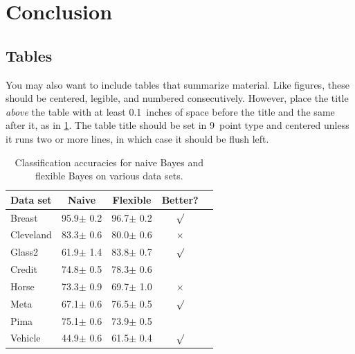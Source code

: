 \documentclass[nohyperref]{article}
\theoremstyle{plain}
\theoremstyle{definition}
\theoremstyle{remark}
\begin{document}
\section{Conclusion}



\subsection{Tables}

You may also want to include tables that summarize material. Like
figures, these should be centered, legible, and numbered consecutively.
However, place the title \emph{above} the table with at least
0.1~inches of space before the title and the same after it, as in
\cref{sample-table}. The table title should be set in 9~point
type and centered unless it runs two or more lines, in which case it
should be flush left.


\begin{table}[t]
\caption{Classification accuracies for naive Bayes and flexible
Bayes on various data sets.}
\label{sample-table}
\vskip 0.15in
\begin{center}
\begin{small}
\begin{sc}
\begin{tabular}{lcccr}
\toprule
Data set & Naive & Flexible & Better? \\
\midrule
Breast    & 95.9$\pm$ 0.2& 96.7$\pm$ 0.2& $\surd$ \\
Cleveland & 83.3$\pm$ 0.6& 80.0$\pm$ 0.6& $\times$\\
Glass2    & 61.9$\pm$ 1.4& 83.8$\pm$ 0.7& $\surd$ \\
Credit    & 74.8$\pm$ 0.5& 78.3$\pm$ 0.6&         \\
Horse     & 73.3$\pm$ 0.9& 69.7$\pm$ 1.0& $\times$\\
Meta      & 67.1$\pm$ 0.6& 76.5$\pm$ 0.5& $\surd$ \\
Pima      & 75.1$\pm$ 0.6& 73.9$\pm$ 0.5&         \\
Vehicle   & 44.9$\pm$ 0.6& 61.5$\pm$ 0.4& $\surd$ \\
\bottomrule
\end{tabular}
\end{sc}
\end{small}
\end{center}
\vskip -0.1in
\end{table}
\end{document}

